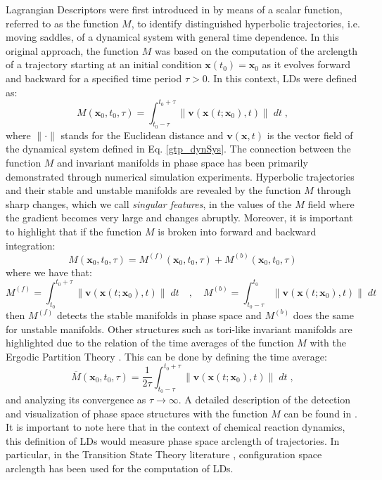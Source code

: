 \documentclass{ws-ijbc}
\begin{document}
Lagrangian Descriptors were first introduced in \cite{madrid2009,mancho2013lagrangian} by means of a scalar function, referred to as the function $M$, to identify distinguished hyperbolic trajectories, i.e. moving saddles, of a dynamical system with general time dependence. In this original approach, the function $M$ was based on the computation of the arclength of a trajectory starting at an initial condition $\mathbf{x}(t_0) = \mathbf{x}_{0}$ as it evolves forward and backward for a specified time period $\tau > 0$. In this context, LDs were defined as:
\begin{equation}
M(\mathbf{x}_{0},t_0,\tau) = \int_{t_0-\tau}^{t_0+\tau}\|\mathbf{v}(\mathbf{x}(t;\mathbf{x}_0),t)\| \; dt \;,
\label{M_classDef} 
\end{equation} 	
where $\|\cdot\|$ stands for the Euclidean distance and $\mathbf{v}(\mathbf{x},t)$ is the vector field of the dynamical system defined in Eq. \eqref{gtp_dynSys}. The connection between the function $M$ and invariant manifolds in phase space has been primarily demonstrated through numerical simulation experiments. Hyperbolic trajectories and their stable and unstable manifolds are revealed by the function $M$ through sharp changes, which we call \textit{singular features}, in the values of the $M$ field where the gradient becomes very large and changes abruptly. Moreover, it is important to highlight that if the function $M$ is broken into forward and backward integration:
\begin{equation}
M(\mathbf{x}_{0},t_0,\tau) = M^{(f)}(\mathbf{x}_{0},t_0,\tau) + M^{(b)}(\mathbf{x}_{0},t_0,\tau)
\end{equation}
where we have that:
\begin{equation}
M^{(f)} = \int_{t_0}^{t_0+\tau}\|\mathbf{v}(\mathbf{x}(t;\mathbf{x}_0),t)\| \; dt \quad,\quad M^{(b)} = \int_{t_0-\tau}^{t_0}\|\mathbf{v}(\mathbf{x}(t;\mathbf{x}_0),t)\| \; dt
\end{equation}
then $M^{(f)}$ detects the stable manifolds in phase space and $M^{(b)}$ does the same for unstable manifolds. Other structures such as tori-like invariant manifolds are highlighted due to the relation of the time averages of the function $M$ with the Ergodic Partition Theory \cite{mezic1999}. This can be done by defining the time average:
\begin{equation}
\overline{M}(\mathbf{x}_{0},t_0,\tau) = \dfrac{1}{2\tau}\int_{t_0-\tau}^{t_0+\tau}\|\mathbf{v}(\mathbf{x}(t;\mathbf{x}_0),t)\| \; dt \;,
\end{equation} 
and analyzing its convergence as $\tau \to\infty$. A detailed description of the detection and visualization of phase space structures with the function $M$ can be found in \cite{mancho2013lagrangian,lopesino2017}. It is important to note here that in the context of chemical reaction dynamics, this definition of LDs would measure phase space arclength of trajectories. In particular, in the Transition State Theory literature \cite{craven2015lagrangian,junginger2016transition,craven2017lagrangian,junginger2017chemical},  configuration space arclength has been used for the computation of LDs. 
\end{document}
